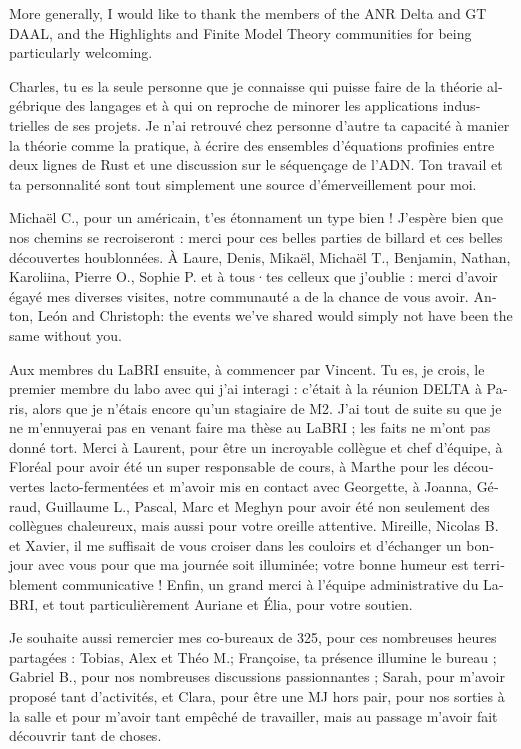 More generally, I would like to thank the members of the ANR Delta and GT DAAL, and the Highlights 
and Finite Model Theory communities for being particularly welcoming.
\begin{french}
Charles, tu es la seule personne que je connaisse qui puisse faire de la théorie algébrique des 
langages et à qui on reproche de minorer les applications industrielles de ses projets.
Je n'ai retrouvé chez personne d'autre ta capacité à manier la théorie comme la pratique, à écrire 
des ensembles d'équations profinies entre deux lignes de Rust et une discussion sur le séquençage 
de l'ADN. Ton travail et ta personnalité sont tout simplement une source d'émerveillement pour moi.

Michaël C., pour un américain, t'es étonnament un type bien !
J'espère bien que nos chemins se recroiseront : merci pour ces
belles parties de billard et ces belles découvertes houblonnées.
À Laure, Denis, Mikaël, Michaël T., Benjamin, Nathan, Karoliina, Pierre O., Sophie P. et à tous·tes celleux que
j'oublie : merci d'avoir égayé mes diverses visites, notre communauté a de la chance de vous avoir. 
Anton, León and Christoph: the events we've shared would simply not have been the same without you.

Aux membres du LaBRI ensuite, à commencer par Vincent. Tu es, je crois, le premier membre du labo
avec qui j'ai interagi : c'était à la réunion DELTA à Paris, alors que je n'étais encore qu'un
stagiaire de M2. J'ai tout de suite su que je ne m'ennuyerai pas en venant faire ma thèse au 
LaBRI ; les faits ne m'ont pas donné tort.
Merci à Laurent, pour être un incroyable collègue et chef d'équipe, à Floréal pour avoir été un
super responsable de cours, à Marthe pour les découvertes lacto-fermentées
et m'avoir mis en contact avec Georgette,
à Joanna, Géraud, Guillaume L., Pascal, Marc et Meghyn pour avoir été 
non seulement des collègues chaleureux, mais aussi pour votre oreille attentive.
Mireille, Nicolas B. et Xavier, il me suffisait de vous croiser dans les couloirs et 
d'échanger un bonjour avec vous pour que ma journée soit illuminée; votre bonne humeur est 
terriblement communicative !
Enfin, un grand merci à l'équipe administrative du LaBRI, et tout particulièrement
Auriane et Élia, pour votre soutien. 

Je souhaite aussi remercier mes co-bureaux de 325, pour ces nombreuses heures partagées : Tobias, Alex et Théo M.; Françoise, ta présence
illumine le bureau ; Gabriel B., pour nos nombreuses discussions passionnantes ;
Sarah, pour m'avoir proposé tant d'activités,
et Clara, pour être une MJ hors pair, pour nos sorties à la salle
et pour m'avoir tant empêché de travailler, mais au passage m’avoir fait découvrir tant de choses.


\end{french}
